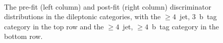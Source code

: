 \begin{figure}
\begin{centering}
\\
\caption[The pre-fit and post-fit distributions in the dileptonic categories]{The pre-fit (left column) and post-fit (right column) discriminator distributions in the dileptonic categories, with the $\geq4$~jet, 3~b~tag category in the top row and the $\geq4$~jet, $\geq4$~b~tag category in the bottom row.}
\label{fig:tth_postfit4}
\end{centering}
\end{figure}

